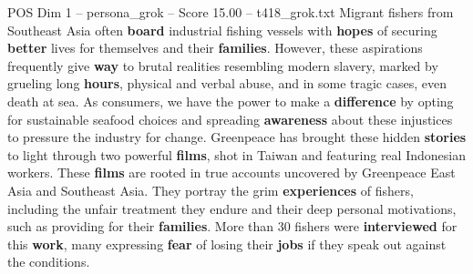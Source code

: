 \begin{textsample}{POS Dim 1 – persona\_grok – Score 15.00 – t418\_grok.txt}  \label{ex:f1_pos_040}
Migrant fishers from Southeast Asia often \textbf{board} industrial fishing vessels with \textbf{hopes} of securing \textbf{better} lives for themselves and their \textbf{families}.
However, these aspirations frequently give \textbf{way} to brutal realities resembling modern slavery, marked by grueling long \textbf{hours}, physical and verbal abuse, and in some tragic cases, even death at sea.
As consumers, we have the power to make a \textbf{difference} by opting for sustainable seafood choices and spreading \textbf{awareness} about these injustices to pressure the industry for change.
Greenpeace has brought these hidden \textbf{stories} to light through two powerful \textbf{films}, shot in Taiwan and featuring real Indonesian workers.
These \textbf{films} are rooted in true accounts uncovered by Greenpeace East Asia and Southeast Asia.
They portray the grim \textbf{experiences} of fishers, including the unfair treatment they endure and their deep personal motivations, such as providing for their \textbf{families}.
More than 30 fishers were \textbf{interviewed} for this \textbf{work}, many expressing \textbf{fear} of losing their \textbf{jobs} if they speak out against the conditions.

\end{textsample}
